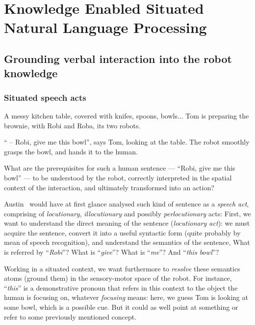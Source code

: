 \chapter{Knowledge Enabled Situated Natural Language Processing}
\label{chapt|dialogs}



\section{Grounding verbal interaction into the robot knowledge}
\label{sect|dialogs}

\subsection{Situated speech acts}
\label{intro_example}

A messy kitchen table, covered with knifes, spoons, bowls... Tom is preparing
the brownie, with Robi and Roba, its two robots.

`` -- Robi, give me this bowl'', says Tom, looking at the table. The robot
smoothly grasps the bowl, and hands it to the human.

What are the prerequisites for such a human sentence --- ``Robi, give me this
bowl'' --- to be understood by the robot, correctly interpreted in the spatial
context of the interaction, and ultimately transformed into an action?

Austin~\cite{Austin1962} would have at first glance analysed such kind of
sentence as a \emph{speech act}, comprising of \emph{locutionary},
\emph{illocutionary} and possibly \emph{perlocutionary} acts: First, we want to
understand the direct meaning of the sentence (\emph{locutionary act}): we must
acquire the sentence, convert it into a useful syntactic form (quite probably
by mean of speech recognition), and understand the semantics of the sentence,
\ie What is referred by ``\textit{Robi}''? What is ``\textit{give}''? What is
``\textit{me}''? And ``\textit{this bowl}''?

Working in a situated context, we want furthermore to \emph{resolve} these
semantics atoms (\ie ground them) in the sensory-motor space of the robot. For
instance, ``\textit{this}'' is a demonstrative pronoun that refers in this
context to the object the human is focusing on, whatever \textit{focusing}
means: here, we guess Tom is looking at some bowl, which is a
possible cue. But it could as well point at something or refer to some
previously mentioned concept.


